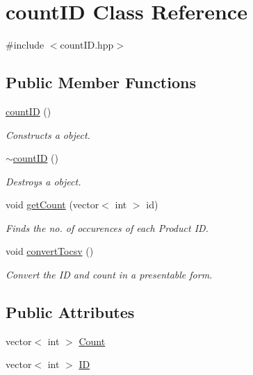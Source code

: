 \hypertarget{classcountID}{}\section{count\+ID Class Reference}
\label{classcountID}


{\ttfamily \#include $<$count\+I\+D.\+hpp$>$}

\subsection*{Public Member Functions}
\begin{DoxyCompactItemize}
\item 
\hyperlink{classcountID_a3f845241ec2577f4789177114384fdba}{count\+ID} ()
\begin{DoxyCompactList}\small\item\em Constructs a object. \end{DoxyCompactList}\item 
\hyperlink{classcountID_a61c8d741bd3e39a4c3331a82e8107f8f}{$\sim$count\+ID} ()
\begin{DoxyCompactList}\small\item\em Destroys a object. \end{DoxyCompactList}\item 
void \hyperlink{classcountID_a0f8694fe0a26804d83df3e8f23a378d1}{get\+Count} (vector$<$ int $>$ id)
\begin{DoxyCompactList}\small\item\em Finds the no. of occurences of each Product ID. \end{DoxyCompactList}\item 
void \hyperlink{classcountID_a0b9b45d607761e1a9dd1cf44e2381b7c}{convert\+Tocsv} ()
\begin{DoxyCompactList}\small\item\em Convert the ID and count in a presentable form. \end{DoxyCompactList}\end{DoxyCompactItemize}
\subsection*{Public Attributes}
\begin{DoxyCompactItemize}
\item 
vector$<$ int $>$ \hyperlink{classcountID_ab579fb8cf43eaaf5e56ff9efec53be7b}{Count}
\item 
vector$<$ int $>$ \hyperlink{classcountID_aa19098f252bab94e0c50937e5a189eb5}{ID}
\end{DoxyCompactItemize}


